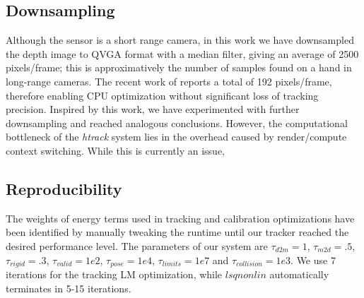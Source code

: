 \subsection*{Downsampling}
Although the \realsense{} sensor is a short range camera, in this work we have downsampled the depth image to QVGA format with a median filter, giving an average of 2500 pixels/frame; this is approximatively the number of samples found on a hand in long-range cameras. The recent work of \cite{taylor2016joint} reports a total of 192 pixels/frame, therefore enabling CPU optimization without significant loss of tracking precision. Inspired by this work, we have experimented with further downsampling and reached analogous conclusions. However, the computational bottleneck of the \emph{htrack} system lies in the overhead caused by render/compute context switching. While this is currently an issue, 

\subsection*{Reproducibility}
% 
The weights of energy terms used in tracking and calibration optimizations have been identified by manually tweaking the runtime until our tracker reached the desired performance level. 
The parameters of our system are $\tau_{d2m}=1$, $\tau_{m2d}=.5$, $\tau_{rigid}=.3$, $\tau_{valid}=1e2$, $\tau_{pose}=1e4$, $\tau_{limits}=1e7$ and $\tau_{collision}=1e3$. We use 7 iterations for the tracking LM optimization, while $lsqnonlin$ automatically terminates in 5-15 iterations. 

